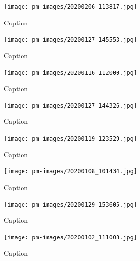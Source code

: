         \clearpage
        
\begin{figure}[]
\centering
\texttt{[image: pm-images/20200206\_113817.jpg]}
\caption{Caption}
\end{figure}

        \clearpage
        
\begin{figure}[]
\centering
\texttt{[image: pm-images/20200127\_145553.jpg]}
\caption{Caption}
\end{figure}

        \clearpage
        
\begin{figure}[]
\centering
\texttt{[image: pm-images/20200116\_112000.jpg]}
\caption{Caption}
\end{figure}

        \clearpage
        
\begin{figure}[]
\centering
\texttt{[image: pm-images/20200127\_144326.jpg]}
\caption{Caption}
\end{figure}

        \clearpage
        
\begin{figure}[]
\centering
\texttt{[image: pm-images/20200119\_123529.jpg]}
\caption{Caption}
\end{figure}

        \clearpage
        
\begin{figure}[]
\centering
\texttt{[image: pm-images/20200108\_101434.jpg]}
\caption{Caption}
\end{figure}

        \clearpage
        
\begin{figure}[]
\centering
\texttt{[image: pm-images/20200129\_153605.jpg]}
\caption{Caption}
\end{figure}

        \clearpage
        
\begin{figure}[]
\centering
\texttt{[image: pm-images/20200102\_111008.jpg]}
\caption{Caption}
\end{figure}

        \clearpage
        
